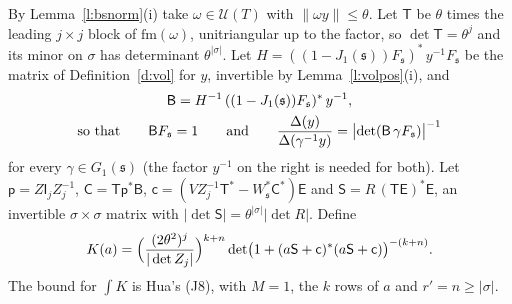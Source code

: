 \documentclass[11pt,a4paper]{article}
\makeatletter
\theoremstyle{plainx}
\theoremstyle{uprightx}
\renewenvironment{proof}[1][Proof]{\par\pushQED{\qed}\normalfont\topsep0pt\partopsep0pt
  \trivlist\item[\hskip\labelsep\itshape #1.]\ignorespaces}{\popQED\endtrivlist\@endpefalse}
\newcommand{\UT}[1]{\mathcal{U}(#1)}
\newcommand{\Gone}[1]{G_1(#1)}
\newcommand{\Jone}[1]{J_1(#1)}
\newcommand{\Inp}[1]{\textup{(#1)}}
\makeatother
\begin{document}
\begin{proof}[Proof of Theorem E]
By Lemma~\ref{l:bsnorm}(i) take $\omega\in\UT{T}$ with $\|\omega y\|\le\theta$. Let $\mathsf{T}$ be $\theta$ times the
leading $j\times j$ block of $\mathrm{fm}(\omega)$, unitriangular up to the factor, so $\det\mathsf{T}=\theta^{j}$
and its minor on $\sigma$ has determinant $\theta^{|\sigma|}$. Let
$H=((1-\Jone{\mathfrak{s}})F_{\mathfrak{s}})^{*}\,y^{-1}F_{\mathfrak{s}}$ be the matrix of Definition~\ref{d:vol} for $y$,
invertible by Lemma~\ref{l:volpos}(i), and
\[\begin{gathered}\mathsf{B}=H^{-1}\,((1-\Jone{\mathfrak{s}})F_{\mathfrak{s}})^{*}\,y^{-1},\\
\text{so that}\qquad\mathsf{B}F_{\mathfrak{s}}=1\qquad\text{and}\qquad
\frac{\frameVolume{y}}{\frameVolume{\gamma^{-1}y}}=\bigl|\det(\mathsf{B}\,\gamma F_{\mathfrak{s}})\bigr|^{-1}\end{gathered}\]
for every $\gamma\in\Gone{\mathfrak{s}}$ (the factor $y^{-1}$ on the right is needed for both). Let
$\mathsf{p}=Z\mathsf{I}_jZ_j^{-1}$, $\mathsf{C}=\mathsf{T}\mathsf{p}^{*}\mathsf{B}$,
$\mathsf{c}=(VZ_j^{-1}\mathsf{T}^{*}-W_{\mathfrak{s}}^{*}\mathsf{C}^{*})\mathsf{E}$ and
$\mathsf{S}=R\,(\mathsf{T}\mathsf{E})^{*}\mathsf{E}$, an invertible $\sigma\times\sigma$ matrix with
$|\det\mathsf{S}|=\theta^{|\sigma|}|\det R|$. Define
\[K(a)=\Bigl(\frac{(2\theta^{2})^{j}}{|\det Z_j|}\Bigr)^{k+n}\det\bigl(1+(a\mathsf{S}+\mathsf{c})^{*}(a\mathsf{S}+\mathsf{c})\bigr)^{-(k+n)}.\]
The bound for $\int K$ is Hua's \Inp{J8}, with $M=1$, the $k$ rows of $a$ and $r'=n\ge|\sigma|$.


\end{proof}
\end{document}
